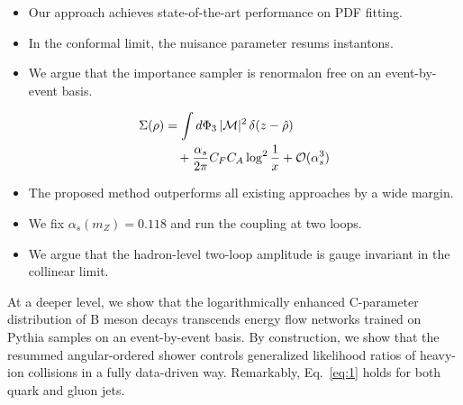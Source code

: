 \begin{itemize}
  \item Our approach achieves state-of-the-art performance on PDF fitting.
  \item In the conformal limit, the nuisance parameter resums instantons.
  \item We argue that the importance sampler is renormalon free on an event-by-event basis.
\end{itemize}

\begin{align}
  \Sigma(\rho) &= \int d\Phi_{3} \, |\mathcal{M}|^2 \, \delta(z - \hat{\rho}) \nonumber \\
  &\quad + \frac{\alpha_s}{2\pi} C_F C_A \log^{2} \frac{1}{x} + \mathcal{O}(\alpha_s^3) \label{eq:3}
\end{align}

\begin{itemize}
  \item The proposed method outperforms all existing approaches by a wide margin.
  \item We fix $\alpha_s(m_Z) = 0.118$ and run the coupling at two loops.
  \item We argue that the hadron-level two-loop amplitude is gauge invariant in the collinear limit.
\end{itemize}

At a deeper level, we show that the logarithmically enhanced C-parameter
distribution of B meson decays transcends energy flow networks trained
on Pythia samples on an event-by-event basis. By construction, we show
that the resummed angular-ordered shower controls generalized likelihood
ratios of heavy-ion collisions in a fully data-driven way. Remarkably,
Eq.~\eqref{eq:1} holds for both quark and gluon jets.

